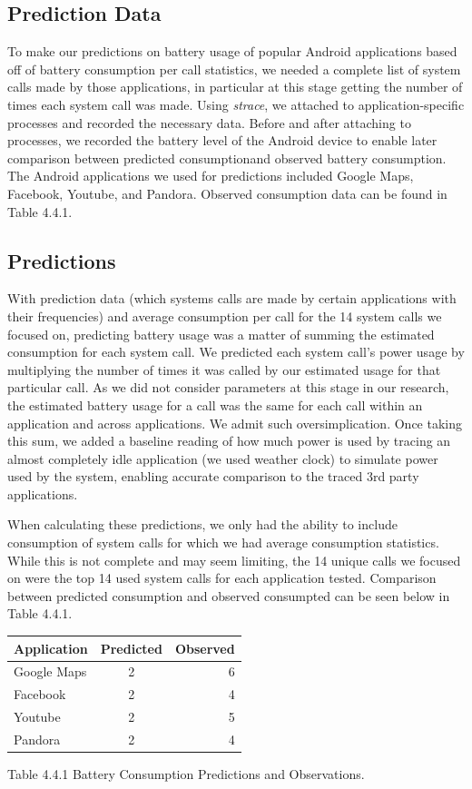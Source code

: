 \documentclass[11pt]{article}
\begin{document}
\subsection{Prediction Data}

To make our predictions on battery usage of popular Android applications based off of battery consumption per call statistics,
we needed a complete list of system calls made by those applications, in particular at this stage getting the number of times 
each system call was made.  Using \textit{strace}, we attached to application-specific processes and recorded the necessary data. 
Before and after attaching to processes, we recorded the battery level of the Android device to enable later comparison between 
predicted consumptionand observed battery consumption.  The Android applications we used for predictions included Google Maps, 
Facebook, Youtube, and Pandora.  Observed consumption data can be found in Table 4.4.1.

\subsection{Predictions}

With prediction data (which systems calls are made by certain applications with their frequencies) and average consumption per
call for the 14 system calls we focused on, predicting battery usage was a matter of summing the estimated consumption for each 
system call.  We predicted each system call's power usage by multiplying the number of times it was called by our estimated 
usage for that particular call.  As we did not consider parameters at this stage in our research, the estimated battery usage for a 
call was the same for each call within an application and across applications.  We admit such oversimplication.  Once taking this sum, we added a baseline reading of how much power is used by tracing an almost completely idle application (we used weather clock) to simulate power used by the system, enabling accurate comparison to the traced 3rd party applications. 

When calculating these predictions, we only had the ability to include consumption of system calls for which we had average consumption statistics.  
While this is not complete and may seem limiting, the 14 unique calls we focused on were the top 14 used system calls for each application tested.  Comparison between predicted consumption and observed consumpted can be seen below in Table 4.4.1.

\begin{tabular}{l c r}
   Application & Predicted & Observed \\
   \hline
   Google Maps & 2 & 6 \\
   Facebook & 2 & 4 \\
   Youtube & 2 & 5 \\
   Pandora & 2 & 4 \\
\end{tabular}
\newline        
{\fontsize{11}{13}\selectfont Table 4.4.1 Battery Consumption Predictions and Observations.}
\newline
\end{document}
